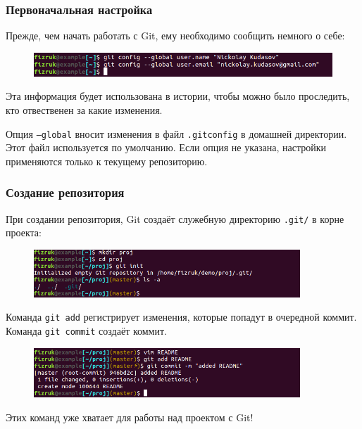 \documentclass{beamer}
\begin{document}
\begin{frame}
  \frametitle{Первоначальная настройка}
  Прежде, чем начать работать с Git, ему необходимо сообщить немного о себе:

  \begin{figure}
     \includegraphics[width=12cm]{images/git-config.png}
  \end{figure}

  Эта информация будет использована в истории, чтобы можно было проследить,
  кто отвественен за какие изменения.

  Опция \texttt{--global} вносит изменения в файл \texttt{.gitconfig} в
  домашней директории. Этот файл используется по умолчанию. Если опция
  не указана, настройки применяются только к текущему репозиторию.
\end{frame}

\begin{frame}
  \frametitle{Создание репозитория}
  При создании репозитория, Git создаёт служебную директорию \texttt{.git/}
  в корне проекта:
  \begin{figure}
     \includegraphics[width=10cm]{images/git-init.png}
  \end{figure}

  Команда \texttt{git add} регистрирует изменения, которые попадут в очередной коммит.
  Команда \texttt{git commit} создаёт коммит.

  \begin{figure}
     \includegraphics[width=10cm]{images/git-add-commit.png}
  \end{figure}

  Этих команд уже хватает для работы над проектом с Git!
\end{frame}
\end{document}
